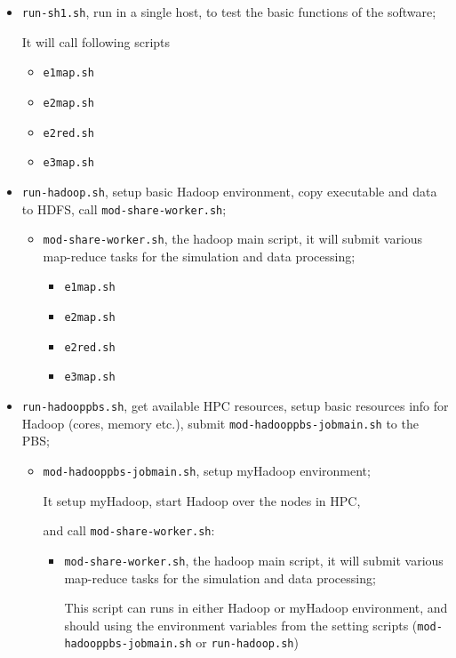 \begin{itemize}
  \item \texttt{run-sh1.sh}, run in a single host, to test the basic functions of the software;


    It will call following scripts
    \begin{itemize}
      \item \texttt{e1map.sh}
      \item \texttt{e2map.sh}
      \item \texttt{e2red.sh}
      \item \texttt{e3map.sh}
    \end{itemize}
  \item \texttt{run-hadoop.sh}, setup basic Hadoop environment, copy executable and data to HDFS, call \texttt{mod-share-worker.sh};
    \begin{itemize}
      \item \texttt{mod-share-worker.sh}, the hadoop main script, it will submit various map-reduce tasks for the simulation and data processing;
        \begin{itemize}
          \item \texttt{e1map.sh}
          \item \texttt{e2map.sh}
          \item \texttt{e2red.sh}
          \item \texttt{e3map.sh}
        \end{itemize}
    \end{itemize}

  \item \texttt{run-hadooppbs.sh}, get available HPC resources, setup basic resources info for Hadoop (cores, memory etc.), submit \texttt{mod-hadooppbs-jobmain.sh} to the PBS;

    \begin{itemize}
      \item \texttt{mod-hadooppbs-jobmain.sh}, setup myHadoop environment;

        It setup myHadoop, start Hadoop over the nodes in HPC,

        and call \texttt{mod-share-worker.sh}:
        \begin{itemize}
          \item \texttt{mod-share-worker.sh}, the hadoop main script, it will submit various map-reduce tasks for the simulation and data processing;

          This script can runs in either Hadoop or myHadoop environment, and should using the environment variables from the setting scripts (\texttt{mod-hadooppbs-jobmain.sh} or \texttt{run-hadoop.sh})


\end{itemize}
\end{itemize}
\end{itemize}
